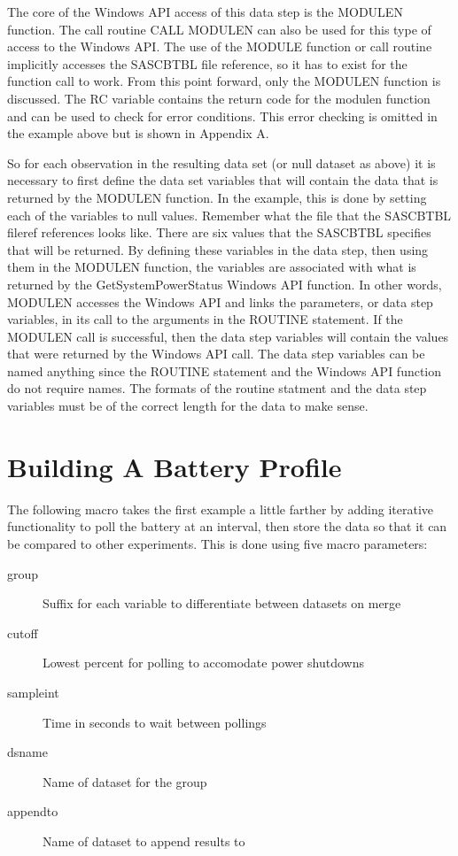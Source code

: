 \documentclass{sugconf}
\begin{document}
The core of the Windows API access of this data step is the MODULEN
function.  The call routine CALL MODULEN can also be used for this
type of access to the Windows API.  The use of the MODULE function
or call routine implicitly accesses the SASCBTBL file reference, so
it has to exist for the function call to work. From this point
forward, only the MODULEN function is discussed.  The RC variable
contains the return code for the modulen function and can be used to
check for error conditions. This error checking is omitted in the
example above but is shown in Appendix A.

So for each observation in the resulting data set (or null dataset
as above) it is necessary to first define the data set variables
that will contain the data that is returned by the MODULEN function.
In the example, this is done by setting each of the variables to
null values.  Remember what the file that the SASCBTBL fileref
references looks like.  There are six values that the SASCBTBL
specifies that will be returned.  By defining these variables in the
data step, then using them in the MODULEN function, the variables
are associated with what is returned by the GetSystemPowerStatus
Windows API function.  In other words, MODULEN accesses the Windows
API and links the parameters, or data step variables,  in its call
to the arguments in the ROUTINE statement.  If the MODULEN call is
successful, then the data step variables will contain the values
that were returned by the Windows API call.  The data step variables
can be named anything since the ROUTINE statement and the Windows
API function do not require names. The formats of the routine
statment and the data step variables must be of the correct length
for the data to make sense.

\section{Building A Battery Profile}
The following macro takes the first example a little farther by
adding iterative functionality to poll the battery at an interval,
then store the data so that it can be compared to other experiments.
This is done using five macro parameters:

\begin{description}
  \item[group] Suffix for each variable to differentiate between
  datasets on merge
  \item[cutoff] Lowest percent for polling to accomodate power
  shutdowns
  \item[sampleint] Time in seconds to wait between pollings
  \item[dsname] Name of dataset for the group
  \item[appendto] Name of dataset to append results to
\end{description}
\end{document}
